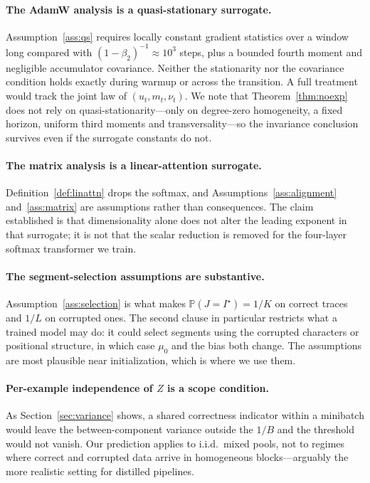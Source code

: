 \documentclass{article}
\theoremstyle{plain}
\theoremstyle{definition}
\theoremstyle{remark}
\newcommand{\Prob}{\mathbb{P}}
\newcommand{\1}{\mathbf{1}}
\begin{document}
\paragraph{The AdamW analysis is a quasi-stationary surrogate.}
Assumption~\ref{ass:qs} requires locally constant gradient statistics over a
window long compared with $(1-\beta_2)^{-1}\approx10^3$ steps, plus a bounded
fourth moment and negligible accumulator covariance. Neither the stationarity nor
the covariance condition holds exactly during warmup or across the transition. A
full treatment would track the joint law of $(u_t,m_t,\nu_t)$. We note that
Theorem~\ref{thm:noexp} does not rely on quasi-stationarity---only on degree-zero
homogeneity, a fixed horizon, uniform third moments and transversality---so the
invariance conclusion survives even if the surrogate constants do not.

\paragraph{The matrix analysis is a linear-attention surrogate.}
Definition~\ref{def:linattn} drops the softmax, and
Assumptions~\ref{ass:alignment} and~\ref{ass:matrix} are assumptions rather than
consequences. The claim established is that dimensionality alone does not alter
the leading exponent in that surrogate; it is not that the scalar reduction is
removed for the four-layer softmax transformer we train.

\paragraph{The segment-selection assumptions are substantive.}
Assumption~\ref{ass:selection} is what makes $\Prob(J=I^\star) = 1/K$ on correct
traces and $1/L$ on corrupted ones. The second clause in particular restricts
what a trained model may do: it could select segments using the corrupted
characters or positional structure, in which case $\mu_0$ and the bias both
change. The assumptions are most plausible near initialization, which is where we
use them.

\paragraph{Per-example independence of $Z$ is a scope condition.}
As Section~\ref{sec:variance} shows, a shared correctness indicator within a
minibatch would leave the between-component variance outside the $1/B$ and the
threshold would not vanish. Our prediction applies to i.i.d.\ mixed pools, not to
regimes where correct and corrupted data arrive in homogeneous blocks---arguably
the more realistic setting for distilled pipelines.
\end{document}
